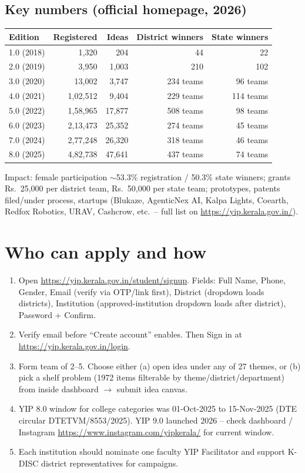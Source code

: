 \documentclass[11pt,a4paper]{article}
\begin{document}
\subsection{Key numbers (official homepage, 2026)}
\begin{center}
\begin{tabular}{lrrrr}
\toprule
Edition & Registered & Ideas & District winners & State winners \\
\midrule
1.0 (2018) & 1,320 & 204 & 44 & 22 \\
2.0 (2019) & 3,950 & 1,003 & 210 & 102 \\
3.0 (2020) & 13,002 & 3,747 & 234 teams & 96 teams \\
4.0 (2021) & 1,02,512 & 9,404 & 229 teams & 114 teams \\
5.0 (2022) & 1,58,965 & 17,877 & 508 teams & 98 teams \\
6.0 (2023) & 2,13,473 & 25,352 & 274 teams & 45 teams \\
7.0 (2024) & 2,77,248 & 26,320 & 318 teams & 46 teams \\
8.0 (2025) & 4,82,738 & 47,641 & 437 teams & 74 teams \\
\bottomrule
\end{tabular}
\end{center}
Impact: female participation $\sim$53.3\% registration / 50.3\% state winners; grants Rs.\ 25,000 per district team, Rs.\ 50,000 per state team; prototypes, patents filed/under process, startups (Blukaze, AgenticNex AI, Kalpa Lights, Coearth, Redfox Robotics, URAV, Cashcrow, etc.\ -- full list on \url{https://yip.kerala.gov.in/}).

\section{Who can apply and how}

\begin{enumerate}[leftmargin=1.4em]
\item Open \url{https://yip.kerala.gov.in/student/signup}. Fields: Full Name, Phone, Gender, Email (verify via OTP/link first), District (dropdown loads districts), Institution (approved-institution dropdown loads after district), Password + Confirm.
\item Verify email before ``Create account'' enables. Then Sign in at \url{https://yip.kerala.gov.in/login}.
\item Form team of 2--5. Choose either (a) open idea under any of 27 themes, or (b) pick a shelf problem (1972 items filterable by theme/district/department) from inside dashboard $\rightarrow$ submit idea canvas.
\item YIP 8.0 window for college categories was 01-Oct-2025 to 15-Nov-2025 (DTE circular DTETVM/8553/2025). YIP 9.0 launched 2026 -- check dashboard / Instagram \url{https://www.instagram.com/yipkerala/} for current window.
\item Each institution should nominate one faculty YIP Facilitator and support K-DISC district representatives for campaigns.
\end{enumerate}
\end{document}

